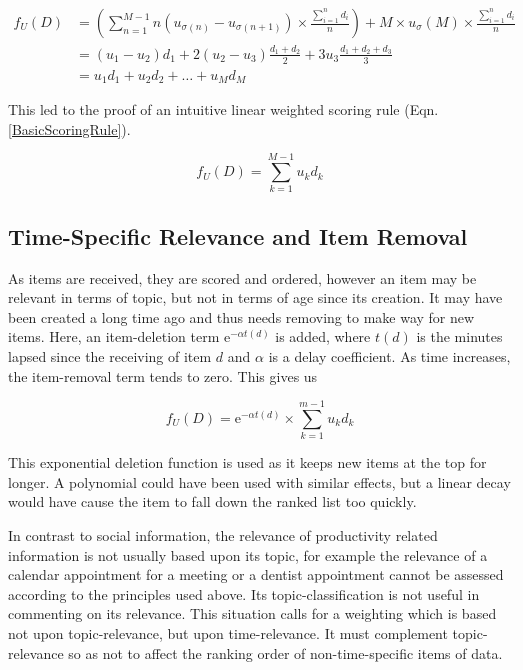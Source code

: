 \begin{align}\label{OurWeightedRuleDerivation}
f_U (D) &= \left(\sum_{n=1}^{M-1} n (u_{\sigma{(n)}} - u_{\sigma{(n+1)}})\times \frac{\sum_{i=1}^{n} d_i}{n}\right) + M \times u_\sigma{(M)} \times \frac{\sum_{i=1}^{n} d_i}{n} 
\\ &= (u_1-u_2)d_1 + 2(u_2-u_3)\frac{d_1+d_2}{2} + 3u_3\frac{d_1+d_2+d_3}{3}
\\ &= u_1d_1 + u_2d_2 + \dots + u_Md_M
\end{align}

This led to the proof of an intuitive linear weighted scoring rule (Eqn. \ref{BasicScoringRule}).

\begin{equation}\label{BasicScoringRule}
f_U (D) = \sum_{k=1}^{M-1} u_kd_k
\end{equation}

\subsection{Time-Specific Relevance and Item Removal}

As items are received, they are scored and ordered, however an item may be relevant in terms of topic, but not in terms of age since its creation. It may have been created a long time ago and thus needs removing to make way for new items. Here, an item-deletion term ${\mathrm{e}}^{-\alpha t(d)}$ is added, where $t(d)$ is the minutes lapsed since the receiving of item $d$ and $\alpha$ is a delay coefficient. As time increases, the item-removal term tends to zero. This gives us

\begin{equation}\label{BasicScoringRule2}
	f_U (D) = {\mathrm{e}}^{-\alpha t(d)} \times \sum_{k=1}^{m-1} u_kd_k
\end{equation}

This exponential deletion function is used as it keeps new items at the top for longer. A polynomial could have been used with similar effects, but a linear decay would have cause the item to fall down the ranked list too quickly.

In contrast to social information, the relevance of productivity related information is not usually based upon its topic, for example the relevance of a calendar appointment for a meeting or a dentist appointment cannot be assessed according to the principles used above. Its topic-classification is not useful in commenting on its relevance. This situation calls for a weighting which is based not upon topic-relevance, but upon time-relevance. It must complement topic-relevance so as not to affect the ranking order of non-time-specific items of data. 

